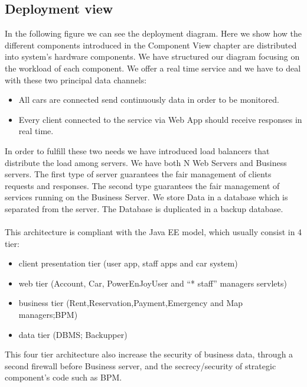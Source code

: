 \documentclass[english]{article}
\begin{document}
	\subsection{Deployment view}
	In the following figure we can see the deployment diagram. Here we show how the different components introduced in the Component View chapter are distributed into system's hardware components.
We have structured our diagram focusing on the workload of each component. We offer a real time service and we have to deal with these two principal data channels:
	\begin{itemize}
		\item All cars are connected send continuously data in order to be monitored. 
		\item Every client connected to the service via Web App should receive responses in real time.
	\end {itemize}
In order to fulfill these two needs we have introduced load balancers that distribute the load among servers. 
We have both N Web Servers and Business servers. The first type of server guarantees the fair management of clients requests and responses. The second type guarantees the fair management of services running on the Business Server.
We store Data in a database which is separated from the server. The Database is duplicated in a backup database.\\\\
This architecture is compliant with the Java EE model, which usually consist in 4 tier: 
		\begin{itemize}
			\item{ client presentation tier (user app, staff apps and car system)}
			\item{ web tier (Account, Car, PowerEnJoyUser and  ``* staff'' managers servlets)}
			\item{ business tier (Rent,Reservation,Payment,Emergency and Map managers;BPM)}
			\item{ data tier (DBMS; Backupper) }
		\end{itemize}
		This four tier architecture also increase the security of business data, through a second firewall before Business server, and the secrecy/security of strategic component's code such as BPM.
		
\end{document}
